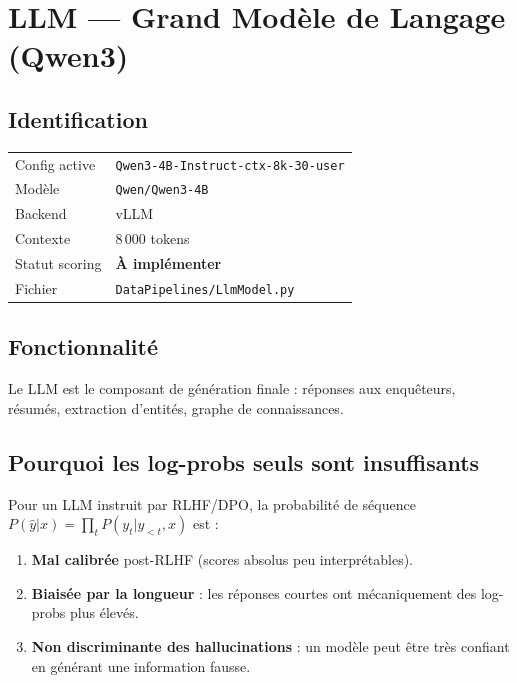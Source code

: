 \chapter{LLM --- Grand Modèle de Langage (Qwen3)}

\section{Identification}

\begin{center}
\begin{tabular}{ll}
\toprule
Config active  & \texttt{Qwen3-4B-Instruct-ctx-8k-30-user} \\
Modèle         & \texttt{Qwen/Qwen3-4B} \\
Backend        & vLLM \\
Contexte       & 8\,000 tokens \\
Statut scoring & \textbf{À implémenter} \\
Fichier        & \texttt{DataPipelines/LlmModel.py} \\
\bottomrule
\end{tabular}
\end{center}

\section{Fonctionnalité}

Le LLM est le composant de génération finale : réponses aux enquêteurs,
résumés, extraction d'entités, graphe de connaissances.

\section{Pourquoi les log-probs seuls sont insuffisants}

Pour un LLM instruit par RLHF/DPO, la probabilité de séquence
$P(\hat{y}|x) = \prod_t P(y_t | y_{<t}, x)$ est :
\begin{enumerate}
  \item \textbf{Mal calibrée} post-RLHF (scores absolus peu interprétables).
  \item \textbf{Biaisée par la longueur} : les réponses courtes ont
        mécaniquement des log-probs plus élevés.
  \item \textbf{Non discriminante des hallucinations} : un modèle peut être
        très confiant en générant une information fausse.
\end{enumerate}

